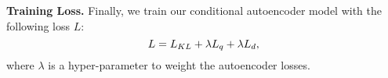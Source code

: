 \documentclass[11pt]{article}
\begin{document}
\textbf{Training Loss.} Finally, we train our conditional autoencoder model with the following loss $L$:
\begin{equation}
\small
        L= L_{KL} + \lambda L_{q} + \lambda L_{d},
\end{equation}
where $\lambda$ is a hyper-parameter to weight the autoencoder losses. \begin{table}
\centering
\small
\caption{Data Statistics.}
\label{tab:dataset}
\end{table} 
\end{document}
